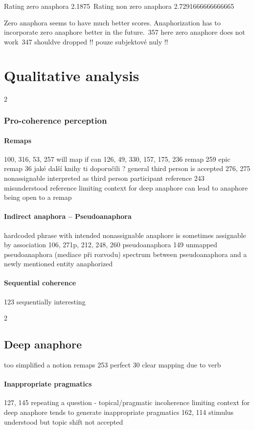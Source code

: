 Rating zero anaphora 2.1875\
Rating non zero anaphora 2.7291666666666665

Zero anaphora seems to have much better scores.
Anaphorization has to incorporate zero anaphore better in the future.\
357 here zero anaphore does not work\
347 shouldve dropped
!! pouze subjektové nuly !!

\section{Qualitative analysis}

2
\subsubsection{Pro-coherence perception}
\paragraph{Remaps}
    100, 316, 53, 257 will map if can
    126, 49, 330, 157, 175, 236 remap
    259 epic remap
    36 jaké další knihy ti doporučili ? general third person is accepted
    276, 275 nonassignable interpreted as third person participant reference
    243 misunderstood reference
    limiting context for deep anaphore can lead to anaphore being open to a remap
\paragraph{Indirect anaphora -- Pseudoanaphora}
    hardcoded phrase with intended nonassignable anaphore is sometimes assignable by association
    106, 271p, 212, 248, 260 pseudoanaphora
    149 unmapped pseudoanaphora (mediace při rozvodu)
    spectrum between pseudoanaphora and a newly mentioned entity anaphorized
\paragraph{Sequential coherence}
    123 sequentially interesting

2
\subsection{Deep anaphore}
    too simplified a notion
    remaps
    253 perfect
    30 clear mapping due to verb
\paragraph{Inappropriate pragmatics}
    127, 145 repeating a question - topical/pragmatic incoherence
        limiting context for deep anaphore tends to generate inappropriate pragmatics
    162, 114 stimulus understood but topic shift not accepted

